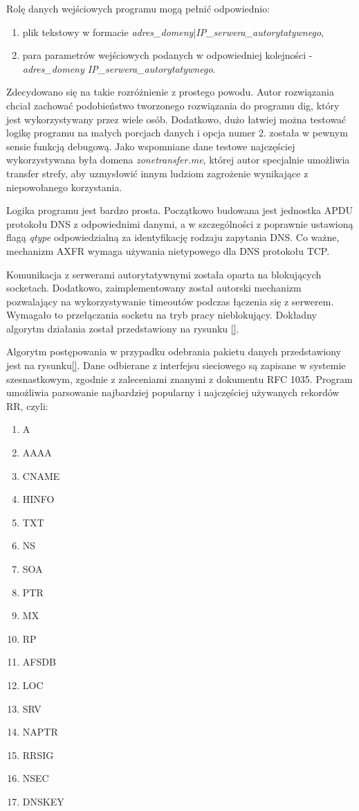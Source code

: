 Rolę danych wejściowych programu mogą pełnić odpowiednio:
\begin{enumerate}
	\item plik tekstowy w formacie \textit{adres\_domeny}|\textit{IP\_serwera\_autorytatywnego},
	\item para parametrów wejściowych podanych w odpowiedniej kolejności - \textit{adres\_domeny IP\_serwera\_autorytatywnego}.
\end{enumerate}
Zdecydowano się na takie rozróżnienie z prostego powodu. Autor rozwiązania chciał zachować podobieństwo tworzonego rozwiązania
do programu dig, który jest wykorzystywany przez wiele osób. Dodatkowo, dużo łatwiej można testować logikę programu na małych
porcjach danych i opcja numer 2. została w pewnym sensie funkcją debugową. Jako wspomniane dane testowe najczęściej wykorzystywana
była domena \textit{zonetransfer.me}\cite{zonetransfer}, której autor specjalnie umożliwia transfer strefy, aby uzmysłowić innym
ludziom zagrożenie wynikające z niepowołanego korzystania.

Logika programu jest bardzo prosta. Początkowo budowana jest jednostka APDU protokołu DNS z odpowiednimi danymi, a w szczególności
z poprawnie ustawioną flagą \textit{qtype} odpowiedzialną za identyfikację rodzaju zapytania DNS. Co ważne, mechanizm AXFR wymaga
używania nietypowego dla DNS protokołu TCP.

Komunikacja z serwerami autorytatywnymi została oparta na blokujących socketach. Dodatkowo, zaimplementowany został autorski
mechanizm pozwalający na wykorzystywanie timeoutów podczas łączenia się z serwerem. Wymagało to przełączania socketu na tryb
pracy nieblokujący. Dokładny algorytm działania został przedstawiony na rysunku \ref{}.

Algorytm postępowania w przypadku odebrania pakietu danych przedstawiony jest na rysunku\ref{}. Dane odbierane z interfejsu
sieciowego są zapisane w systemie szesnastkowym, zgodnie z zaleceniami znanymi z dokumentu RFC 1035\cite{RFC1035}. Program
umożliwia parsowanie najbardziej popularny i najczęściej używanych rekordów RR, czyli:
\begin{enumerate}
	\item A
	\item AAAA
	\item CNAME
	\item HINFO
	\item TXT
	\item NS
	\item SOA
	\item PTR
	\item MX
	\item RP
	\item AFSDB
	\item LOC
	\item SRV
	\item NAPTR
	\item RRSIG
	\item NSEC
	\item DNSKEY
\end{enumerate}


